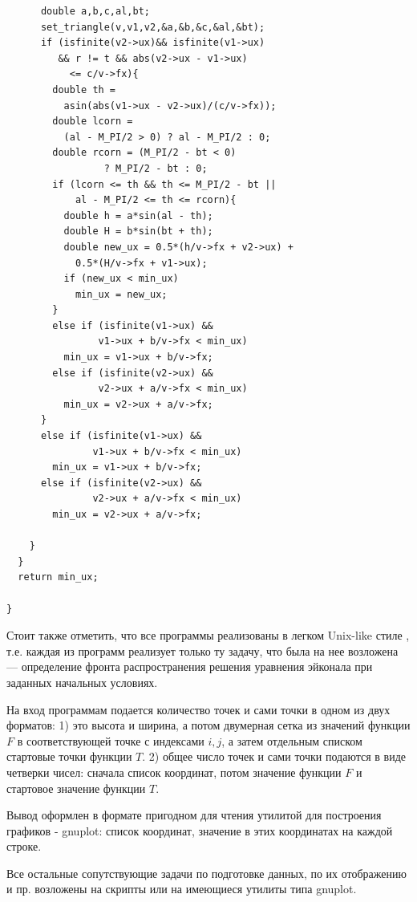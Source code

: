 \documentclass[a4paper,12pt]{article}
\makeatletter
\renewcommand{\section}{\@startsection{section}{1}{0cm}{-3.5ex plus -1ex minus -.2ex}{2.3ex plus.2ex}{\raggedright\normalfont}}
\makeatother
\begin{document}
\begin{verbatim}
      double a,b,c,al,bt;
      set_triangle(v,v1,v2,&a,&b,&c,&al,&bt);
      if (isfinite(v2->ux)&& isfinite(v1->ux) 
         && r != t && abs(v2->ux - v1->ux)
           <= c/v->fx){
        double th = 
          asin(abs(v1->ux - v2->ux)/(c/v->fx));
        double lcorn = 
          (al - M_PI/2 > 0) ? al - M_PI/2 : 0;
        double rcorn = (M_PI/2 - bt < 0) 
                 ? M_PI/2 - bt : 0;
        if (lcorn <= th && th <= M_PI/2 - bt || 
            al - M_PI/2 <= th <= rcorn){
          double h = a*sin(al - th);
          double H = b*sin(bt + th);
          double new_ux = 0.5*(h/v->fx + v2->ux) +
            0.5*(H/v->fx + v1->ux);
          if (new_ux < min_ux)
            min_ux = new_ux;
        }
        else if (isfinite(v1->ux) && 
                v1->ux + b/v->fx < min_ux)
          min_ux = v1->ux + b/v->fx;
        else if (isfinite(v2->ux) && 
                v2->ux + a/v->fx < min_ux)
          min_ux = v2->ux + a/v->fx;
      }
      else if (isfinite(v1->ux) && 
               v1->ux + b/v->fx < min_ux)
        min_ux = v1->ux + b/v->fx;
      else if (isfinite(v2->ux) && 
               v2->ux + a/v->fx < min_ux)
        min_ux = v2->ux + a/v->fx;

    }
  }
  return min_ux;

}

\end{verbatim}
\large

Стоит также отметить, что все программы реализованы в легком Unix-like
стиле \cite{AP2016}, т.е. каждая из программ реализует только ту
задачу, что была на нее возложена --- определение фронта
распространения решения уравнения эйконала при заданных начальных
условиях.

На вход программам подается количество точек и сами точки в одном из
двух форматов: 1) это высота и ширина, а потом двумерная сетка из
значений функции $F$ в соответствующей точке с индексами $i,j$, а
затем отдельным списком стартовые точки функции $T$.  2) общее число
точек и сами точки подаются в виде четверки чисел: сначала список
координат, потом значение функции $F$ и стартовое значение функции
$T$.

Вывод оформлен в формате пригодном для чтения утилитой для построения
графиков - gnuplot: список координат, значение в этих координатах на
каждой строке.

Все остальные сопутствующие задачи по подготовке данных, по их
отображению и пр. возложены на скрипты или на имеющиеся утилиты типа
gnuplot. 


\pagebreak
\section{Примеры}
\label{sec:samples}
\end{document}
